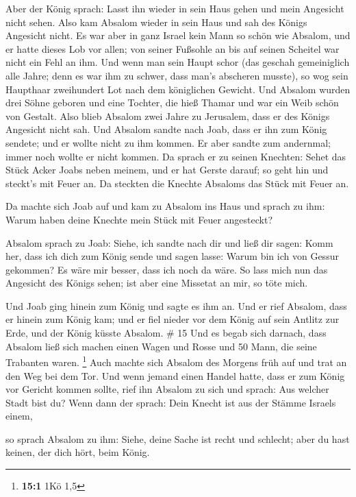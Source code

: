  Aber der König sprach: Lasst ihn wieder in sein Haus
gehen und mein Angesicht nicht sehen. Also kam Absalom wieder in sein
Haus und sah des Königs Angesicht nicht.  Es war aber in
ganz Israel kein Mann so schön wie Absalom, und er hatte dieses Lob vor
allen; von seiner Fußsohle an bis auf seinen Scheitel war nicht ein Fehl
an ihm.  Und wenn man sein Haupt schor (das geschah
gemeiniglich alle Jahre; denn es war ihm zu schwer, dass man's abscheren
musste), so wog sein Haupthaar zweihundert Lot nach dem königlichen
Gewicht.  Und Absalom wurden drei Söhne geboren und eine
Tochter, die hieß Thamar und war ein Weib schön von Gestalt.
 Also blieb Absalom zwei Jahre zu Jerusalem, dass er des
Königs Angesicht nicht sah.  Und Absalom sandte nach
Joab, dass er ihn zum König sendete; und er wollte nicht zu ihm kommen.
Er aber sandte zum andernmal; immer noch wollte er nicht kommen.
 Da sprach er zu seinen Knechten: Sehet das Stück Acker
Joabs neben meinem, und er hat Gerste darauf; so geht hin und steckt's
mit Feuer an. Da steckten die Knechte Absaloms das Stück mit Feuer an.

 Da machte sich Joab auf und kam zu Absalom ins Haus und
sprach zu ihm: Warum haben deine Knechte mein Stück mit Feuer
angesteckt?

 Absalom sprach zu Joab: Siehe, ich sandte nach dir und
ließ dir sagen: Komm her, dass ich dich zum König sende und sagen lasse:
Warum bin ich von Gessur gekommen? Es wäre mir besser, dass ich noch da
wäre. So lass mich nun das Angesicht des Königs sehen; ist aber eine
Missetat an mir, so töte mich.

 Und Joab ging hinein zum König und sagte es ihm an. Und
er rief Absalom, dass er hinein zum König kam; und er fiel nieder vor
dem König auf sein Antlitz zur Erde, und der König küsste Absalom. \# 15
 Und es begab sich darnach, dass Absalom ließ sich machen
einen Wagen und Rosse und 50 Mann, die seine Trabanten waren.
\footnote{\textbf{15:1} 1Kö 1,5}  Auch machte sich Absalom
des Morgens früh auf und trat an den Weg bei dem Tor. Und wenn jemand
einen Handel hatte, dass er zum König vor Gericht kommen sollte, rief
ihn Absalom zu sich und sprach: Aus welcher Stadt bist du? Wenn dann der
sprach: Dein Knecht ist aus der Stämme Israels einem,

 so sprach Absalom zu ihm: Siehe, deine Sache ist recht
und schlecht; aber du hast keinen, der dich hört, beim König.

